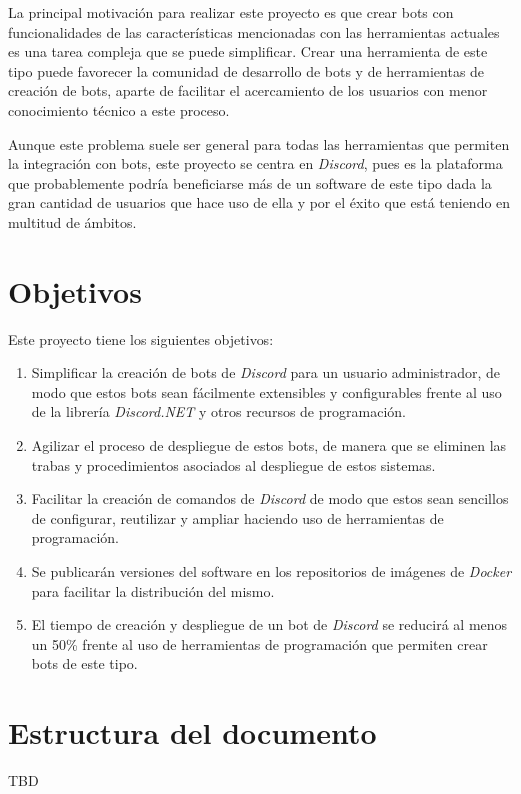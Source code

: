 La principal motivación para realizar este proyecto es que crear bots con funcionalidades de las características mencionadas con las herramientas actuales es una tarea compleja que se puede simplificar. Crear una herramienta de este tipo puede favorecer la comunidad de desarrollo de bots y de herramientas de creación de bots, aparte de facilitar el acercamiento de los usuarios con menor conocimiento técnico a este proceso.

Aunque este problema suele ser general para todas las herramientas que permiten la integración con bots, este proyecto se centra en \textit{Discord}, pues es la plataforma que probablemente podría beneficiarse más de un software de este tipo dada la gran cantidad de usuarios que hace uso de ella y por el éxito\cite{enlyft} que está teniendo en multitud de ámbitos.

\section{Objetivos}

Este proyecto tiene los siguientes objetivos:

\begin{enumerate}
	\item Simplificar la creación de bots de \textit{Discord} para un usuario administrador, de modo que estos bots sean fácilmente extensibles y configurables frente al uso de la librería \textit{Discord.NET} y otros recursos de programación.
	\item Agilizar el proceso de despliegue de estos bots, de manera que se eliminen las trabas y procedimientos asociados al despliegue de estos sistemas.
	\item Facilitar la creación de comandos de \textit{Discord} de modo que estos sean sencillos de configurar, reutilizar y ampliar haciendo uso de herramientas de programación.
	\item Se publicarán versiones del software en los repositorios de imágenes de \textit{Docker} para facilitar la distribución del mismo.
	\item El tiempo de creación y despliegue de un bot de \textit{Discord} se reducirá al menos un 50\% frente al uso de herramientas de programación que permiten crear bots de este tipo.
\end{enumerate}

\section{Estructura del documento}

TBD
